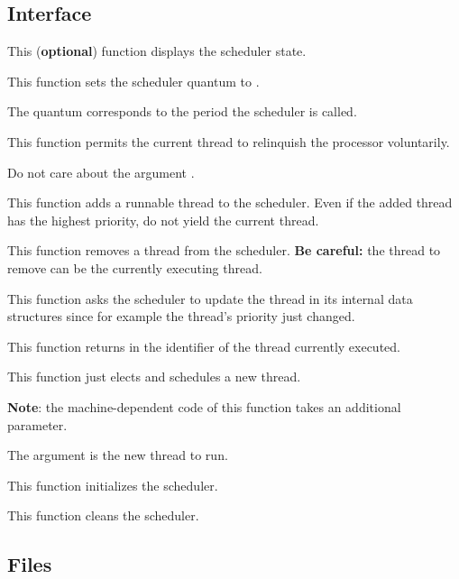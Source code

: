\subsection*{Interface}

{
  This (\textbf{optional}) function displays the scheduler state.
}

{
  This function sets the scheduler quantum to .

  The quantum corresponds to the period the scheduler is called.
}

{
  This function permits the current thread to relinquish
  the processor voluntarily.

  Do not care about the argument .
}

{
  This function adds a runnable thread to the scheduler. Even
  if the added thread has the highest priority, do not yield
  the current thread.
}

{
  This function removes a thread from the
  scheduler. \textbf{Be careful:} the thread to remove can be
  the currently executing thread.
}

{
  This function asks the scheduler to update the thread
   in its internal data structures since
  for example the thread's priority just changed.
}

{
  This function returns in  the identifier
  of the thread currently executed.
}

{
  This function just elects and schedules a new thread.

  \textbf{Note}: the machine-dependent code of this function
  takes an additional parameter.

  {
    The argument  is the new
    thread to run.
  }
}

{
  This function initializes the scheduler.
}

{
  This function cleans the scheduler.
}

\subsection*{Files}

